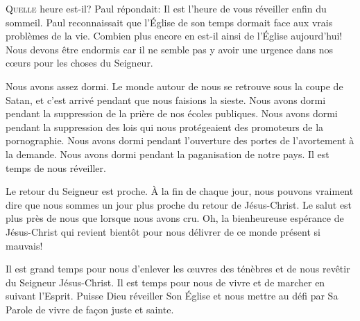 \dvrule







\lettrine{Q}{uelle} heure est-il?
 Paul répondait: 
 \Og Il est l'heure de vous réveiller enfin du sommeil. \Fg{}
 Paul reconnaissait que l'Église  de son temps
 dormait face aux vrais problèmes de la vie.
 Combien plus encore en est-il ainsi de l'Église  aujourd'hui!
 Nous devons être endormis car il ne semble pas y avoir une urgence
 dans nos c\oe{}urs pour les choses du Seigneur.

Nous avons assez dormi. Le monde autour de nous se retrouve sous la coupe de Satan,
 et c'est arrivé pendant que nous faisions la sieste.
 Nous avons dormi pendant la suppression de la prière
 de nos écoles publiques. Nous avons dormi pendant la suppression
 des lois qui nous protégeaient des promoteurs de la pornographie.
 Nous avons dormi pendant l'ouverture des portes de l'avortement à la demande.
 Nous avons dormi pendant la paganisation de notre pays.
 Il est temps de nous réveiller.


Le retour du Seigneur est proche.
 À la fin de chaque jour, nous pouvons vraiment dire que nous sommes
 un jour plus proche du retour de Jésus-Christ.
 Le salut est plus près de nous que lorsque nous avons cru.
 Oh, la bienheureuse espérance de Jésus-Christ qui revient bientôt
 pour nous délivrer de ce monde présent si mauvais!

Il est grand temps pour nous d'enlever les \oe{}uvres des ténèbres
 et de nous revêtir du Seigneur Jésus-Christ.
 Il est temps pour nous de vivre et de marcher en suivant l'Esprit.
 Puisse Dieu réveiller Son Église 
 et nous mettre au défi par Sa Parole de vivre de fa\c{c}on juste et sainte.

